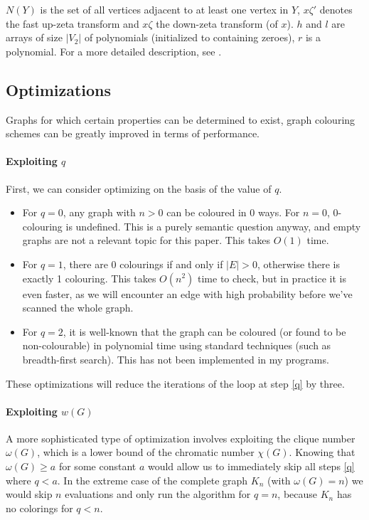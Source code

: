 \documentclass[a4paper]{article}
\begin{document}
$N(Y)$ is the set of all vertices adjacent to at least one vertex in $Y$, $x\zeta'$ denotes the fast up-zeta transform and $x\zeta$ the down-zeta transform (of $x$). $h$ and $l$ are arrays of size $|V_2|$ of polynomials (initialized to containing zeroes), $r$ is a polynomial. For a more detailed description, see \cite{cov_pack}.

\subsection{Optimizations}\label{opts}
Graphs for which certain properties can be determined to exist, graph colouring schemes can be greatly improved in terms of performance. %

\paragraph{Exploiting $q$}
First, we can consider optimizing on the basis of the value of $q$.
\begin{itemize}
\item For $q = 0$, any graph with $n > 0$ can be coloured in 0 ways. For $n = 0$, 0-colouring is undefined. This is a purely semantic question anyway, and empty graphs are not a relevant topic for this paper. This takes $O(1)$ time.
\item For $q = 1$, there are 0 colourings if and only if $|E| > 0$, otherwise there is exactly 1 colouring. This takes $O(n^2)$ time to check, but in practice it is even faster, as we will encounter an edge with high probability before we've scanned the whole graph.
\item For $q = 2$, it is well-known that the graph can be coloured (or found to be non-colourable) in polynomial time using standard techniques (such as breadth-first search). This has not been implemented in my programs.
\end{itemize}

These optimizations will reduce the iterations of the loop at step \ref{q} by three.

\paragraph{Exploiting $w(G)$}
A more sophisticated type of optimization involves exploiting the clique number $\omega(G)$, which is a lower bound of the chromatic number $\chi(G)$\cite{clique}. Knowing that $\omega(G) \geq a$ for some constant $a$ would allow us to immediately skip all steps \ref{q} where $q < a$. In the extreme case of the complete graph $K_n$ (with $\omega(G) = n$) we would skip $n$ evaluations and only run the algorithm for $q = n$, because $K_n$ has no colorings for $q < n$.
\end{document}
